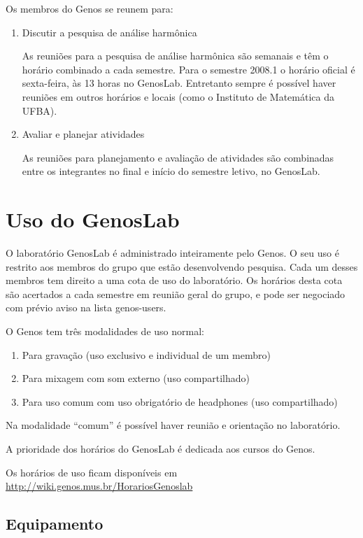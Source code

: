 \documentclass[12pt,brazil]{book}
\begin{document}
Os membros do Genos se reunem para:

\begin{enumerate}
\item Discutir a pesquisa de análise harmônica

  As reuniões para a pesquisa de análise harmônica são semanais e têm
  o horário combinado a cada semestre. Para o semestre 2008.1 o
  horário oficial é sexta-feira, às 13 horas no GenosLab. Entretanto
  sempre é possível haver reuniões em outros horários e locais (como o
  Instituto de Matemática da UFBA).

\item Avaliar e planejar atividades

  As reuniões para planejamento e avaliação de atividades são
  combinadas entre os integrantes no final e início do semestre
  letivo, no GenosLab.

\end{enumerate}

\section{Uso do GenosLab}
\label{sec:uso-do-genoslab}

O laboratório GenosLab é administrado inteiramente pelo Genos. O seu
uso é restrito aos membros do grupo que estão desenvolvendo
pesquisa. Cada um desses membros tem direito a uma cota de uso do
laboratório. Os horários desta cota são acertados a cada semestre em
reunião geral do grupo, e pode ser negociado com prévio aviso na lista
genos-users.

O Genos tem três modalidades de uso normal:
\begin{enumerate}
\item Para gravação (uso exclusivo e individual de um membro)
\item Para mixagem com som externo (uso compartilhado)
\item Para uso comum com uso obrigatório de headphones (uso
  compartilhado)
\end{enumerate}

Na modalidade ``comum'' é possível haver reunião e orientação no
laboratório.

A prioridade dos horários do GenosLab é dedicada aos cursos do Genos.

Os horários de uso ficam disponíveis em
\url{http://wiki.genos.mus.br/HorariosGenoslab}

\subsection{Equipamento}
\label{sec:equipamento}
\end{document}
